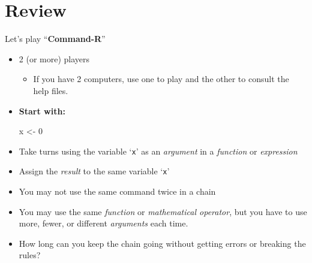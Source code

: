 \documentclass[
  11pt,
  ignorenonframetext,
]{beamer}
\newenvironment{Shaded}{\begin{snugshade}}{\end{snugshade}}
\newcommand{\DecValTok}[1]{\textcolor[rgb]{0.00,0.00,0.81}{#1}}
\newcommand{\NormalTok}[1]{#1}
\newcommand{\OtherTok}[1]{\textcolor[rgb]{0.56,0.35,0.01}{#1}}
\newcommand{\VariableTok}[1]{\textcolor[rgb]{0.00,0.00,0.00}{#1}}
\providecommand{\tightlist}{%
  \setlength{\itemsep}{0pt}\setlength{\parskip}{0pt}}
\newcommand{\name}[1]{\VariableTok{\texttt{#1}}}
\begin{document}
\hypertarget{review}{%
\section{Review}\label{review}}

\begin{frame}{Let's play ``\textbf{Command-R}''}
\protect\hypertarget{lets-play-command-r}{}
\begin{itemize}
\item
  2 (or more) players

  \begin{itemize}
  \tightlist
  \item
    If you have 2 computers, use one to play and the other to consult
    the help files.
  \end{itemize}
\item
  \textbf{Start with:}

\begin{Shaded}
\begin{Highlighting}[]
\NormalTok{x }\OtherTok{\textless{}{-}} \DecValTok{0}
\end{Highlighting}
\end{Shaded}
\item
  Take turns using the variable `\name{x}' as an \emph{argument} in a
  \emph{function} or \emph{expression}
\item
  Assign the \emph{result} to the same variable `\name{x}'
\item
  You may not use the same command twice in a chain
\item
  You may use the same \emph{function} or \emph{mathematical operator},
  but you have to use more, fewer, or different \emph{arguments} each
  time.
\item
  How long can you keep the chain going without getting errors or
  breaking the rules?
\end{itemize}
\end{frame}
\end{document}
